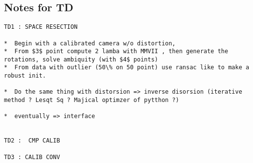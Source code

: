 \subsection{Notes for TD}


\begin{verbatim}
TD1 : SPACE RESECTION

*  Begin with a calibrated camera w/o distortion,
*  From $3$ point compute 2 lamba with MMVII , then generate the rotations, solve ambiquity (with $4$ points)
*  From data with outlier (50\% on 50 point) use ransac like to make a robust init.

*  Do the same thing with distorsion => inverse disorsion (iterative method ? Lesqt Sq ? Majical optimzer of pytthon ?)

*  eventually => interface


TD2 :  CMP CALIB

TD3 : CALIB CONV
\end{verbatim}




